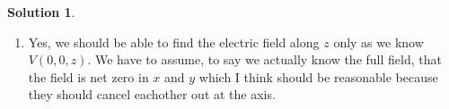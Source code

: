 \documentclass[10pt]{article}
\theoremstyle{definition}
\newtheorem{soln}{Solution}
\newcommand{\primed}[1]{{#1^\prime}}
\begin{document}
\begin{soln}
\begin{enumerate}[label=(\alph*)]
\begin{align*}
             & \quad \left.\left.+ \eval{\ln\abs{\sec \left(\arctan\left(u/R\right)\right) + \tan \left(\arctan\left(u/R\right)\right)}\right)}_{-L/2}^{L/2}-zL\right]                                                                                              \\
             & =\frac{\rho}{2\epsilon_0}\left[\frac{R^2}{2}\eval{\left(\frac{u}{R}\sqrt{1+u^2/R^2} + \ln\abs{\sqrt{1+u^2/R^2} + u/R}\right)}_{-L/2}^{L/2}-zL\right]                                                                                                 \\
             & =\frac{\rho}{2\epsilon_0}\left[\frac{R^2}{2}\eval{\left(\frac{\left(\primed{z}-z\right)}{R}\sqrt{1+\left(\primed{z}-z\right)^2/R^2} + \ln\abs{\sqrt{1+\left(\primed{z}-z\right)^2/R^2} + \left(\primed{z}-z\right)/R}\right)}_{-L/2}^{L/2}-zL\right] \\
             & =\frac{\rho}{2\epsilon_0}\left[
              \frac{R^2}{2}\left(\frac{\left(L/2-z\right)}{R}\sqrt{1+\left(L/2-z\right)^2/R^2}
            + \ln\abs{\sqrt{1+\left(L/2-z\right)^2/R^2} + \left(L/2-z\right)/R}\right)\right.                                                                                                                                                                       \\
             & \quad\left.-\frac{R^2}{2}\left(\frac{\left(-L/2-z\right)}{R}\sqrt{1+\left(-L/2-z\right)^2/R^2}
              - \ln\abs{\sqrt{1+\left(-L/2-z\right)^2/R^2} + \left(-L/2-z\right)/R}\right)
            -zL\right]                                                                                                                                                                                                                                              \\
          \end{align*}
          Wow! I'm going to use SageMath (a computer algebra system) to simplify that a bit because it's a mess!
          Sage spits out:
          \begin{align*}
             & = \frac{\rho}{\epsilon_0}\left[-2Lz+
              \left(z+L/2\right)\sqrt{R^2+(z+L/2)^2}
            -\left(z-L/2\right)\sqrt{R^2+(z-L/2)^2}\right.                                                                            \\
             & \quad\left.+R^2\ln\left(\frac{\sqrt{R^2+(z+L/2)^2}+\left(z+L/2\right)}{\sqrt{R^2+(z-L/2)^2}+\left(z-L/2\right)}\right)
              \right]
          \end{align*}
    \item Yes, we should be able to find the electric field along $z$ only as we know $V(0,0,z)$. We have to assume, to say we actually know the full field,
    that the field is net zero in $x$ and $y$ which I think should be reasonable because they should cancel eachother out at the axis.
  \end{enumerate}
\end{soln}
\end{document}
